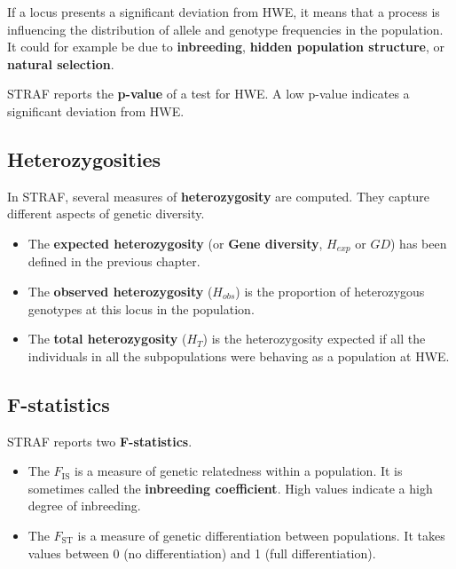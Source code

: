 \documentclass[
]{book}
\begin{document}
If a locus presents a significant deviation from HWE, it means that a process
is influencing the distribution of allele and genotype frequencies in the population.
It could for example be due to \textbf{inbreeding}, \textbf{hidden population structure},
or \textbf{natural selection}.

STRAF reports the \textbf{p-value} of a test for HWE. A low p-value indicates a significant
deviation from HWE.

\hypertarget{heterozygosities}{%
\subsection{Heterozygosities}\label{heterozygosities}}

In STRAF, several measures of \textbf{heterozygosity} are computed. They capture
different aspects of genetic diversity.

\begin{itemize}
\item
  The \textbf{expected heterozygosity} (or \textbf{Gene diversity}, \(H_{exp}\) or \(GD\)) has been defined in the previous chapter.
\item
  The \textbf{observed heterozygosity} (\(H_{obs}\)) is the proportion of heterozygous genotypes at this locus in the population.
\item
  The \textbf{total heterozygosity} (\(H_T\)) is the heterozygosity expected if all the
  individuals in all the subpopulations were behaving as a population at HWE.
\end{itemize}

\hypertarget{f-statistics}{%
\subsection{F-statistics}\label{f-statistics}}

STRAF reports two \textbf{F-statistics}.

\begin{itemize}
\item
  The \(F_{\textrm{IS}}\) is a measure of genetic relatedness within a population.
  It is sometimes called the \textbf{inbreeding coefficient}. High values indicate
  a high degree of inbreeding.
\item
  The \(F_{\textrm{ST}}\) is a measure of genetic differentiation between populations.
  It takes values between 0 (no differentiation) and 1 (full differentiation).
\end{itemize}
\end{document}
